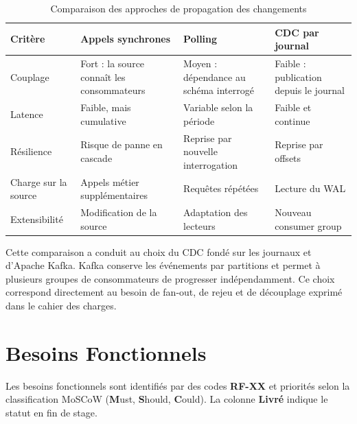 \documentclass[12pt,a4paper,openany]{report}
\begin{document}
    \begin{table}[H]
    \centering
    \small
    \begin{tabularx}{\textwidth}{P{3.0cm}XXX}
    \toprule
    \textbf{Crit\`ere} & \textbf{Appels synchrones} & \textbf{Polling} & \textbf{CDC par journal} \\
    \midrule
    Couplage & Fort : la source conna\^it les consommateurs & Moyen : d\'ependance au sch\'ema interrog\'e & Faible : publication depuis le journal \\[3pt]
    Latence & Faible, mais cumulative & Variable selon la p\'eriode & Faible et continue \\[3pt]
    R\'esilience & Risque de panne en cascade & Reprise par nouvelle interrogation & Reprise par offsets \\[3pt]
    Charge sur la source & Appels m\'etier suppl\'ementaires & Requ\^etes r\'ep\'et\'ees & Lecture du WAL \\[3pt]
    Extensibilit\'e & Modification de la source & Adaptation des lecteurs & Nouveau consumer group \\
    \bottomrule
    \end{tabularx}
    \caption{Comparaison des approches de propagation des changements}
    \label{tab:etude-existant}
    \end{table}

    Cette comparaison a conduit au choix du CDC fond\'e sur les journaux et d'Apache Kafka. Kafka conserve les \'ev\'enements par partitions et permet \`a plusieurs groupes de consommateurs de progresser ind\'ependamment\cite{kafka-documentation}. Ce choix correspond directement au besoin de fan-out, de rejeu et de d\'ecouplage exprim\'e dans le cahier des charges.

    \section{Besoins Fonctionnels}

    Les besoins fonctionnels sont identifi\'es par des codes \textbf{RF-XX} et priorit\'es selon la classification MoSCoW (\textbf{M}ust, \textbf{S}hould, \textbf{C}ould). La colonne \textbf{Livr\'e} indique le statut en fin de stage.
\end{document}
